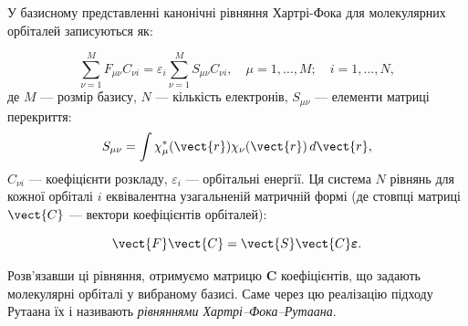 У базисному представленні канонічні рівняння Хартрі-Фока для молекулярних орбіталей записуються як:

\begin{equation}\label{eq:HFR_basis_form}
	\sum_{\nu=1}^M F_{\mu\nu} C_{\nu i} = \varepsilon_i \sum_{\nu=1}^M S_{\mu\nu} C_{\nu i}, \quad \mu = 1, \dots, M; \quad i = 1, \dots, N,
\end{equation}
%
де $M$ --- розмір базису, $N$ --- кількість електронів, $S_{\mu\nu}$ --- елементи матриці перекриття:
\begin{equation*}
	S_{\mu\nu} = \int \chi_\mu^*(\vect{r}) \chi_\nu(\vect{r}) \, d\vect{r},
\end{equation*}
%
$C_{\nu i}$ --- коефіцієнти розкладу, $\varepsilon_i$ --- орбітальні енергії.
%
Ця система $N$ рівнянь для кожної орбіталі $i$ еквівалентна узагальненій матричній формі (де стовпці матриці $\vect{C}$ --- вектори коефіцієнтів орбіталей):

\begin{equation}\label{eq:roothf_matrix}
	\vect{F} \vect{C} = \vect{S} \vect{C} \boldsymbol{\varepsilon}.
\end{equation}

Розв’язавши ці рівняння, отримуємо матрицю $\mathbf C$ коефіцієнтів, що задають молекулярні орбіталі у вибраному базисі. Саме через цю реалізацію підходу Рутаана їх і називають \emph{рівняннями Хартрі–Фока–Рутаана}.

